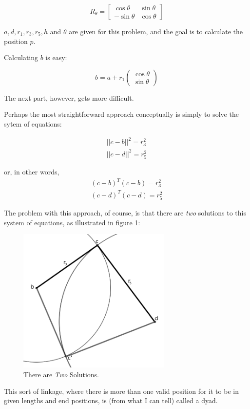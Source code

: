 \documentclass[12pt, letterpaper]{article}
\begin{document}
\[R_{\theta}=\begin{bmatrix}\cos \theta & \sin \theta \\ -\sin \theta & \cos \theta \end{bmatrix}\]

\(a, d, r_1, r_3, r_5, h\) and \(\theta\) are given for this problem, and the goal is to calculate the position \(p\).

Calculating \(b\) is easy:

\[b=a+r_1\begin{pmatrix}\cos\theta \\ \sin\theta\end{pmatrix}\]

The next part, however, gets more difficult.

Perhaps the most straightforward approach conceptually is simply to solve the sytem of equations:

\begin{align*}||c-b||^2=r_3^2\\
||c-d||^2=r_5^2\end{align*}

or, in other words,
\begin{align*}(c-b)^T(c-b)=r_3^2\\
(c-d)^T(c-d)=r_5^2\end{align*}

The problem with this approach, of course, is that there are \emph{two} solutions to this system of equations, as illustrated in figure \ref{fig:dyad}:

\begin{figure}[H]
\caption{There are \emph{Two} Solutions.} 
\label{fig:dyad}
\centering
\includegraphics[width=3in]{dyad}
\end{figure}

This sort of linkage, where there is more than one valid position for it to be in given lengths and end positions, is (from what I can tell) called a dyad.
\end{document}
